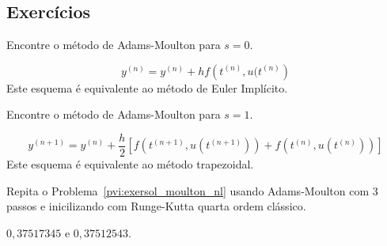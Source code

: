 \subsection*{Exercícios}

\begin{exer}
Encontre o método de Adams-Moulton para $s=0$.
\end{exer}
\begin{resp}
 \begin{equation*}
  y^{(n)}=y^{(n)}+hf\left(t^{(n)},u(t^{(n)}\right)
 \end{equation*}
Este esquema é equivalente ao método de Euler Implícito.
 \end{resp}



\begin{exer}
Encontre o método de Adams-Moulton para $s=1$.
\end{exer}
\begin{resp}
 \begin{equation*}
  y^{(n+1)}=y^{(n)}+\frac{h}{2}\left[f\left(t^{(n+1)},u(t^{(n+1)})\right)+f\left(t^{(n)},u(t^{(n)})\right)\right]
 \end{equation*}
 Este esquema é equivalente ao método trapezoidal.
 \end{resp}

 
 \begin{exer} Repita o Problema~\ref{pvi:exersol_moulton_nl} usando Adams-Moulton com 3 passos e inicilizando com Runge-Kutta quarta ordem clássico.
  \end{exer}
\begin{resp}
 $0,37517345$ e  $0,37512543$.
\end{resp}

